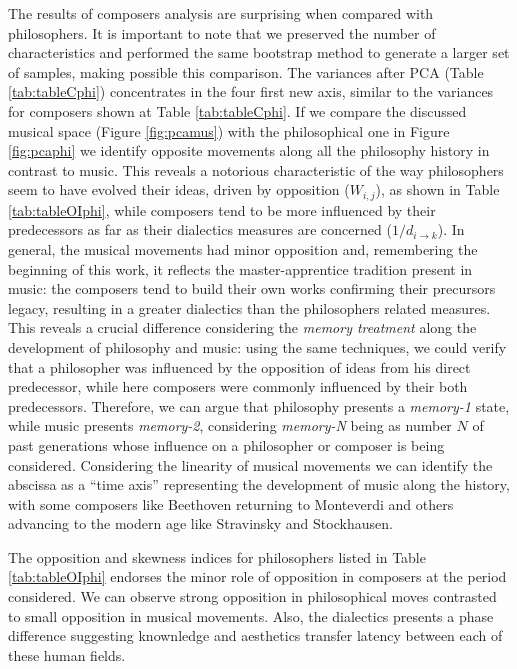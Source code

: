 \documentclass[
 aip,
 jmp,
 amsmath,amssymb,
 reprint,
]{revtex4-1}
\begin{document}
The results of composers analysis are surprising when compared with philosophers. It is important to note that we preserved the
number of characteristics and performed the same bootstrap method to
generate a larger set of samples, making possible this
comparison. The variances after PCA (Table \ref{tab:tableCphi}) concentrates in the four first new axis, similar to the variances for composers shown at Table \ref{tab:tableCphi}. If we compare the discussed musical space (Figure \ref{fig:pcamus})
with the philosophical one in Figure \ref{fig:pcaphi} we
identify opposite movements along all the philosophy history in contrast
to music. This reveals a notorious characteristic of the way
philosophers seem to have evolved their ideas, driven by opposition ($W_{i,j}$), as shown in Table \ref{tab:tableOIphi}, while
composers tend to be more influenced by their predecessors as far as their dialectics measures are
concerned ($1/d_{i \rightarrow k}$).
In general, the musical movements had minor opposition and,
remembering the beginning of this work, it reflects the
master-apprentice
tradition present in music: the composers tend to build their own
works confirming their precursors legacy, resulting in a greater
dialectics than the philosophers related measures.
This reveals a crucial difference
considering the \textit{memory treatment} along the development of
philosophy and music: using the same techniques,
we could verify that a philosopher was influenced by the
opposition of ideas from his direct predecessor, while here composers were commonly
influenced by their both predecessors. Therefore, we can argue that philosophy
presents a \textit{memory-1} state, while music presents
\textit{memory-2}, considering \textit{memory-N} being as number $N$
of past generations whose influence on a philosopher or
composer is being considered. Considering the linearity of musical movements we can
identify the abscissa as a ``time axis'' representing the development
of music along the history, with some composers
like Beethoven returning to Monteverdi and others advancing to the
modern age like Stravinsky and Stockhausen.

The opposition and skewness indices for philosophers listed in Table
\ref{tab:tableOIphi} endorses the minor role of opposition in
composers at the period considered. We can observe strong opposition
in philosophical moves contrasted to small opposition in
musical movements. Also, the dialectics presents a
phase difference suggesting knownledge and aesthetics 
transfer latency between each of these human fields.
\end{document}
